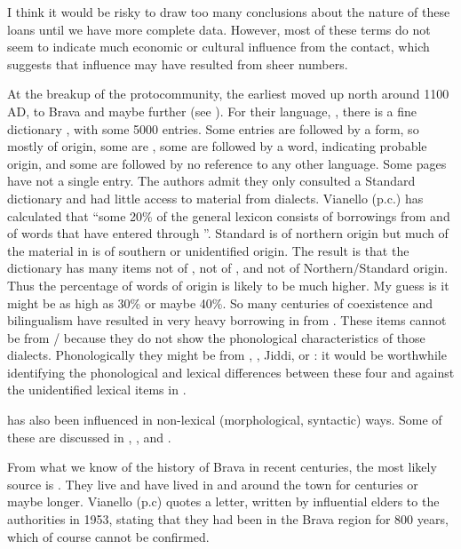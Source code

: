 \documentclass[output=paper
,newtxmath
,modfonts
,nonflat]{langsci/langscibook}
\begin{document}
  I think it would be risky to draw too many conclusions about the nature of these loans until we have more complete data. However, most of these terms do not seem to indicate much economic or cultural influence from the  contact, which suggests that  influence may have resulted from sheer numbers. 

  At the breakup of the protocommunity, the earliest  moved up north around 1100 AD, to Brava and maybe further (see ). For their language, , there is a fine dictionary \citep{Kisseberth2004}, with some 5000 entries. Some entries are followed by a  form, so mostly of  origin, some are , some are followed by a  word, indicating probable  origin, and some are followed by no reference to any other language. Some pages have not a single  entry. The authors admit they only consulted a Standard  dictionary and had little access to material from  dialects. Vianello (p.c.) has calculated that “some 20\% of the general lexicon consists of borrowings from  and of  words that have entered  through ”. Standard  is of northern origin but much of the material in  is of southern or unidentified  origin. The result is that the dictionary has many items not of , not of , and not of Northern/Standard  origin. Thus the percentage of words of  origin is likely to be much higher. My guess is it might be as high as 30\% or maybe 40\%. So many centuries of coexistence and bilingualism have resulted in very heavy borrowing in  from . These items cannot be from / because they do not show the phonological characteristics of those dialects. Phonologically they might be from , , Jiddi, or : it would be worthwhile identifying the phonological and lexical differences between these four and against the unidentified lexical items in . 

   has also been influenced in non-lexical (morphological, syntactic) ways. Some of these are discussed in \citet{nurse1991}, \citet{Henderson2010}, and \citet{Vianello2015}. 

From what we know of the history of Brava in recent centuries, the most likely source is . They live and have lived in and around the town for centuries or maybe longer. Vianello (p.c) quotes a letter, written by influential  elders to the  authorities in 1953, stating that they had been in the Brava region for 800 years, which of course cannot be confirmed. 
\end{document}
